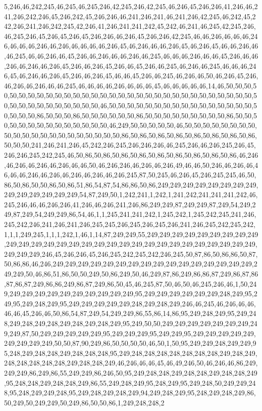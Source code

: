 5,246,46,242,245,46,245,46,245,246,42,245,246,42,245,46,246,45,246,246,41,246,46,241,246,242,246,45,246,242,45,246,246,46,241,246,241,46,241,246,42,245,46,242,45,242,246,241,246,242,245,42,246,41,246,241,241,242,45,242,46,241,46,245,42,245,246,46,245,246,45,246,45,246,45,246,246,46,246,45,246,246,42,245,46,46,246,46,46,46,246,46,46,46,246,46,246,46,46,46,46,246,45,46,246,46,46,246,45,46,246,45,46,46,246,46,46,245,46,46,246,46,45,246,46,246,46,46,246,46,245,46,46,46,246,46,46,45,246,46,46,246,46,246,46,246,45,246,46,246,45,246,46,45,246,46,245,46,246,46,245,46,46,46,246,45,46,246,46,246,45,246,46,246,45,46,46,45,246,46,245,46,246,46,50,46,246,45,246,46,246,46,246,46,46,245,46,46,46,46,246,46,46,46,45,46,46,46,46,46,14,46,50,50,50,50,50,50,50,50,50,50,50,50,50,50,50,50,50,50,50,50,50,50,50,50,50,50,50,50,50,50,50,50,50,50,50,50,50,50,50,50,50,50,46,50,50,50,50,50,50,50,50,50,50,50,50,50,50,50,50,50,50,50,50,86,50,50,50,86,50,50,50,50,50,50,86,50,50,50,50,50,50,50,50,50,86,50,50,50,50,50,50,50,50,50,50,50,50,50,50,46,249,50,50,50,50,50,46,50,50,50,50,50,50,50,50,50,50,50,50,50,50,50,50,50,50,50,50,50,86,50,86,50,86,50,86,50,86,50,86,50,86,50,86,50,50,50,241,246,241,246,45,242,246,245,246,246,246,46,245,246,46,246,245,246,45,246,246,245,242,245,46,50,86,50,86,50,86,50,86,50,86,50,86,50,86,50,86,50,86,46,246,46,246,46,246,46,246,46,46,50,46,246,246,46,246,46,246,49,46,46,50,246,46,246,46,46,46,46,246,46,246,46,246,46,246,46,246,245,87,50,245,46,246,45,246,245,245,46,50,86,50,86,50,50,86,50,86,51,86,54,87,54,86,86,50,86,249,249,249,249,249,249,249,249,249,249,249,249,249,249,54,87,249,50,1,242,241,1,242,1,241,242,241,241,241,242,46,245,246,46,46,246,246,41,246,46,246,241,246,86,249,249,87,249,249,87,249,54,249,249,87,249,54,249,249,86,54,46,1,1,245,241,241,242,1,245,242,1,245,242,245,241,246,245,242,246,241,246,241,246,245,245,246,245,246,245,246,241,246,245,242,245,242,1,1,1,249,245,1,1,1,242,1,46,1,14,87,249,249,55,249,249,249,249,249,249,249,249,249,249,249,249,249,249,249,249,249,249,249,249,249,249,249,249,249,249,249,249,249,249,249,249,246,45,246,246,45,246,245,242,245,242,246,245,50,87,86,50,86,86,50,87,50,86,86,46,246,249,249,249,249,249,249,249,249,249,249,249,249,249,249,249,249,249,249,50,46,86,51,86,50,50,249,50,86,249,50,46,249,87,86,249,86,86,87,249,86,87,86,87,86,87,249,86,86,249,86,87,249,86,50,45,46,245,87,50,46,50,46,245,246,46,1,50,249,249,249,249,249,249,249,249,249,249,249,95,249,249,249,249,249,249,248,249,95,249,95,249,248,249,95,249,249,249,249,249,248,249,248,249,246,46,245,46,246,46,46,46,46,45,246,46,50,86,54,87,249,54,249,249,86,55,86,14,86,95,249,248,249,95,249,248,249,248,249,248,249,248,249,248,249,95,249,50,50,249,249,249,249,249,249,249,249,249,87,50,249,249,249,249,249,95,249,249,249,95,249,249,95,249,249,249,249,249,249,249,249,249,50,50,87,90,249,86,50,50,50,50,46,50,1,50,95,249,249,248,249,249,95,248,249,248,248,249,248,248,248,95,249,248,248,248,248,248,248,248,249,248,249,248,248,248,248,248,249,248,248,249,46,246,46,46,45,46,49,246,50,46,246,46,86,249,249,249,86,249,86,55,249,249,86,246,50,95,249,248,248,249,248,248,249,248,248,249,95,248,248,249,248,248,249,86,55,249,248,249,95,248,249,95,249,248,50,249,249,248,95,248,249,249,248,95,249,248,249,248,249,94,249,248,249,95,248,249,248,249,86,50,249,50,249,249,50,249,86,50,50,86,1,249,248,248,2